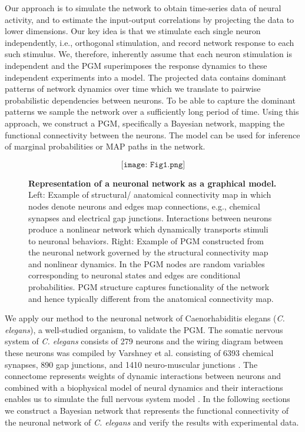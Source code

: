 \documentclass[letterpaper,11pt]{article}
\begin{document}
Our approach is to simulate the network to obtain time-series data of neural activity, and to estimate the input-output correlations by projecting the data to lower dimensions. Our key idea is that we stimulate each single neuron independently, i.e., orthogonal stimulation, and record network response to each such stimulus. We, therefore, inherently assume that each neuron stimulation is independent and the PGM superimposes the response dynamics to these independent experiments into a model. The projected data contains dominant patterns of network dynamics over time which we translate to pairwise probabilistic dependencies between neurons. To be able to capture the dominant patterns we sample the network over a sufficiently long period of time. Using this approach, we construct a PGM, specifically a Bayesian network, mapping the functional connectivity between the neurons. The model can be used for inference of marginal probabilities or MAP paths in the network.
\begin{figure}[t]
  \[\texttt{[image: Fig1.png]}\]
  \caption{\textbf{Representation of a neuronal network as a graphical model.} Left: Example of structural/ anatomical connectivity map in which nodes denote neurons and edges map connections, e.g., chemical synapses and electrical gap junctions. Interactions between neurons produce a nonlinear network which dynamically transports stimuli to neuronal behaviors. Right: Example of PGM constructed from the neuronal network governed by the structural connectivity map and nonlinear dynamics. In the PGM nodes are random variables corresponding to neuronal states and edges are conditional probabilities. PGM structure captures functionality of the network and hence typically different from the anatomical connectivity map.}
\end{figure}

We apply our method to the neuronal network of Caenorhabiditis elegans (\textit{C. elegans}), a well-studied organism, to validate the PGM. The somatic nervous system of \textit{C. elegans} consists of  279 neurons and the wiring diagram between these neurons was compiled by Varshney et al. consisting of 6393 chemical synapses, 890 gap junctions, and 1410 neuro-muscular junctions \cite{connectome}. The connectome represents weights of  dynamic interactions between neurons and combined with a biophysical model of neural dynamics and their interactions enables us to simulate the full nervous system model \cite{dynamic1,dynamic2,dynome}. In the following sections we construct a Bayesian network that represents the functional connectivity of the neuronal network of \textit{C. elegans} and verify the results with experimental data.
\end{document}
